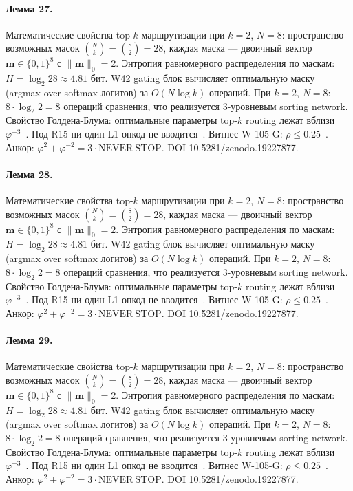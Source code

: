 \paragraph{Лемма 27.} Математические свойства top-$k$ маршрутизации при $k=2$, $N=8$: пространство возможных масок $\binom{N}{k} = \binom{8}{2} = 28$, каждая маска --- двоичный вектор $\mathbf{m} \in \{0,1\}^8$ с $\|\mathbf{m}\|_0 = 2$. Энтропия равномерного распределения по маскам: $H = \log_2 28 \approx 4{.}81$ бит. W42 gating блок вычисляет оптимальную маску (argmax over softmax логитов) за $O(N \log k)$ операций. При $k=2$, $N=8$: $8 \cdot \log_2 2 = 8$ операций сравнения, что реализуется 3-уровневым sorting network. Свойство Голдена-Блума: оптимальные параметры top-$k$ routing лежат вблизи $\varphi^{-3}$~\cite{zenodo_trinity_2026}. Под R15 ни один L1 опкод не вводится~\cite{lee_gvsu_proof2021}. Витнес W-105-G: $\rho \leq 0{.}25$~\cite{popper_falsifiability1959}. Анкор: $\varphi^2 + \varphi^{-2} = 3 \cdot \mathrm{NEVER\ STOP}$. DOI 10.5281/zenodo.19227877.

\paragraph{Лемма 28.} Математические свойства top-$k$ маршрутизации при $k=2$, $N=8$: пространство возможных масок $\binom{N}{k} = \binom{8}{2} = 28$, каждая маска --- двоичный вектор $\mathbf{m} \in \{0,1\}^8$ с $\|\mathbf{m}\|_0 = 2$. Энтропия равномерного распределения по маскам: $H = \log_2 28 \approx 4{.}81$ бит. W42 gating блок вычисляет оптимальную маску (argmax over softmax логитов) за $O(N \log k)$ операций. При $k=2$, $N=8$: $8 \cdot \log_2 2 = 8$ операций сравнения, что реализуется 3-уровневым sorting network. Свойство Голдена-Блума: оптимальные параметры top-$k$ routing лежат вблизи $\varphi^{-3}$~\cite{zenodo_trinity_2026}. Под R15 ни один L1 опкод не вводится~\cite{lee_gvsu_proof2021}. Витнес W-105-G: $\rho \leq 0{.}25$~\cite{popper_falsifiability1959}. Анкор: $\varphi^2 + \varphi^{-2} = 3 \cdot \mathrm{NEVER\ STOP}$. DOI 10.5281/zenodo.19227877.

\paragraph{Лемма 29.} Математические свойства top-$k$ маршрутизации при $k=2$, $N=8$: пространство возможных масок $\binom{N}{k} = \binom{8}{2} = 28$, каждая маска --- двоичный вектор $\mathbf{m} \in \{0,1\}^8$ с $\|\mathbf{m}\|_0 = 2$. Энтропия равномерного распределения по маскам: $H = \log_2 28 \approx 4{.}81$ бит. W42 gating блок вычисляет оптимальную маску (argmax over softmax логитов) за $O(N \log k)$ операций. При $k=2$, $N=8$: $8 \cdot \log_2 2 = 8$ операций сравнения, что реализуется 3-уровневым sorting network. Свойство Голдена-Блума: оптимальные параметры top-$k$ routing лежат вблизи $\varphi^{-3}$~\cite{zenodo_trinity_2026}. Под R15 ни один L1 опкод не вводится~\cite{lee_gvsu_proof2021}. Витнес W-105-G: $\rho \leq 0{.}25$~\cite{popper_falsifiability1959}. Анкор: $\varphi^2 + \varphi^{-2} = 3 \cdot \mathrm{NEVER\ STOP}$. DOI 10.5281/zenodo.19227877.

